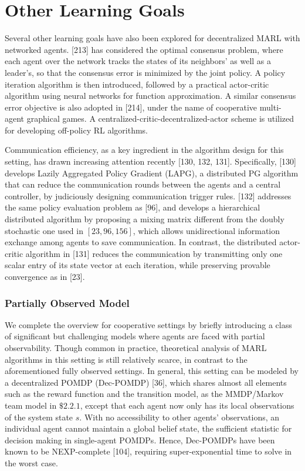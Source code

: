 \documentclass[10pt]{article}
\begin{document}
\section{Other Learning Goals}
Several other learning goals have also been explored for decentralized MARL with networked agents. [213] has considered the optimal consensus problem, where each agent over the network tracks the states of its neighbors' as well as a leader's, so that the consensus error is minimized by the joint policy. A policy iteration algorithm is then introduced, followed by a practical actor-critic algorithm using neural networks for function approximation. A similar consensus error objective is also adopted in [214], under the name of cooperative multi-agent graphical games. A centralized-critic-decentralized-actor scheme is utilized for developing off-policy RL algorithms.

Communication efficiency, as a key ingredient in the algorithm design for this setting, has drawn increasing attention recently [130, 132, 131]. Specifically, [130] develops Lazily Aggregated Policy Gradient (LAPG), a distributed PG algorithm that can reduce the communication rounds between the agents and a central controller, by judiciously designing communication trigger rules. [132] addresses the same policy evaluation problem as [96], and develops a hierarchical distributed algorithm by proposing a mixing matrix different from the doubly stochastic one used in $[23,96,156]$, which allows unidirectional information exchange among agents to save communication. In contrast, the distributed actor-critic algorithm in [131] reduces the communication by transmitting only one scalar entry of its state vector at each iteration, while preserving provable convergence as in [23].

\subsubsection{Partially Observed Model}
We complete the overview for cooperative settings by briefly introducing a class of significant but challenging models where agents are faced with partial observability. Though common in practice, theoretical analysis of MARL algorithms in this setting is still relatively scarce, in contrast to the aforementioned fully observed settings. In general, this setting can be modeled by a decentralized POMDP (Dec-POMDP) [36], which shares almost all elements such as the reward function and the transition model, as the MMDP/Markov team model in $\$ 2.2 .1$, except that each agent now only has its local observations of the system state $s$. With no accessibility to other agents' observations, an individual agent cannot maintain a global belief state, the sufficient statistic for decision making in single-agent POMDPs. Hence, Dec-POMDPs have been known to be NEXP-complete [104], requiring super-exponential time to solve in the worst case.
\end{document}
